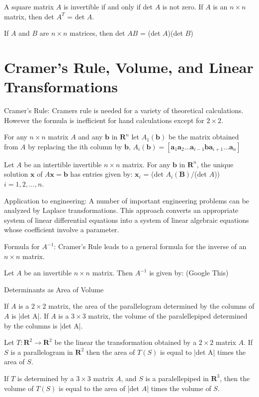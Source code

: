 \documentclass[../linalg.tex]{subfiles}
\begin{document}
\begin{theorem}
    A square matrix $A$ is invertible if and only if det $A$ is not zero. If $A$ is an $n\times n$ matrix, then det $A^T$ = det $A$.
\end{theorem}

\begin{theorem}
    If $A$ and $B$ are $n\times n$ matrices, then det $AB$ = (det $A$)(det $B$)
\end{theorem}

\section{Cramer's Rule, Volume, and Linear Transformations}
Cramer's Rule: Cramers rule is needed for a variety of theoretical calculations. However the formula is inefficient for hand calculations except for $2\times 2$.

For any $n\times n$ matrix $A$ and any $\textbf{b}$ in $\textbf{R}^n$ let $A_1(\textbf{b})$ be the matrix obtained from $A$ by replacing the ith column by $\textbf{b}$, $A_i(\textbf{b})= [\textbf{a}_1 \textbf{a}_2 \dots \textbf{a}_{i-1} \textbf{b} \textbf{a}_{i+1} \dots \textbf{a}_n]$

\begin{theorem}
    Let $A$ be an intertible invertible $n\times n$ matrix. For any $\textbf{b}$ in $\textbf{R}^n$, the unique solution $\textbf{x}$ of $A\textbf{x}=\textbf{b}$ has entries given by: $\textbf{x}_i$ = (det $A_i(\textbf{B})$/(det $A$)) $i=1,2,\dots,n$.
\end{theorem}

Application to engineering: A number of important engineering problems can be analyzed by Laplace transformations. This approach converts an appropriate system of linear differential equations into a 
system of linear algebraic equations whose coefficient involve a parameter.

Formula for $A^{-1}$: Cramer's Rule leads to a general formula for the inverse of an $n\times n$ matrix.
\begin{theorem}
    Let $A$ be an invertible $n\times n$ matrix. Then $A^{-1}$ is given by:
    (Google This)
\end{theorem}

Determinants as Area of Volume
\begin{theorem}
    If $A$ is a $2\times 2$ matrix, the area of the parallelogram determined by the columns of $A$ is |det A|. If $A$ is a $3\times 3$ matrix, the volume of the paralellepiped determined by the columns is |det A|.
\end{theorem}

\begin{theorem}
    Let $T:\textbf{R}^2 \rightarrow \textbf{R}^2$ be the linear the transformation obtained by a $2\times 2$ matrix $A$. If $S$ is a parallelogram in $\textbf{R}^2$ then the area of $T(S)$ is equal to |det A| times the area of $S$.

    If $T$ is determined by a $3\times 3$ matrix $A$, and $S$ is a paralellepiped in $\textbf{R}^3$, then the volume of $T(S)$ is equal to the area of |det $A$| times the volume of $S$.
\end{theorem}
\end{document}

